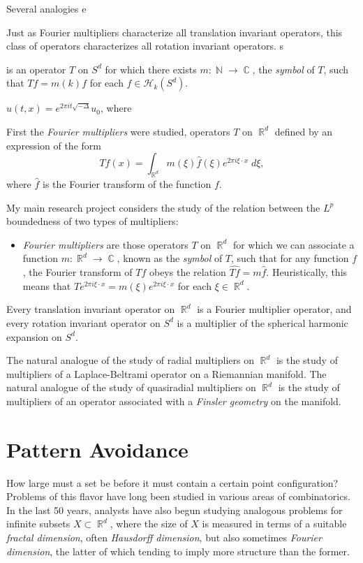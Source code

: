 \documentclass[12pt]{article}
\DeclareMathOperator{\RR}{\mathbb{R}}
\DeclareMathOperator{\NN}{\mathbb{N}}
\DeclareMathOperator{\CC}{\mathbb{C}}
\begin{document}
Several analogies e


Just as Fourier multipliers characterize all translation invariant operators, this class of operators characterizes all rotation invariant operators. 
s



 is an operator $T$ on $S^d$ for which there exists $m: \NN \to \CC$, the \emph{symbol} of $T$, such that $Tf = m(k) f$ for each $f \in \mathcal{H}_k(S^d)$.


$u(t,x) = e^{2 \pi i t \sqrt{-\Delta}} u_0$, where

First the \emph{Fourier multipliers} were studied, operators $T$ on $\RR^d$ defined by an expression of the form
%
\[ Tf(x) = \int_{\RR^d} m(\xi) \widehat{f}(\xi) e^{2 \pi i \xi \cdot x}\; d\xi, \]
%
where $\widehat{f}$ is the Fourier transform of the function $f$.

My main research project considers the study of the relation between the $L^p$ boundedness of two types of multipliers:
%
\begin{itemize}
	\item \emph{Fourier multipliers} are those operators $T$ on $\RR^d$ for which we can associate a function $m: \RR^d \to \CC$, known as the \emph{symbol} of $T$, such that for any function $f$, the Fourier transform of $Tf$ obeys the relation $\widehat{Tf} = m \widehat{f}$. Heuristically, this means that $T e^{2 \pi i \xi \cdot x} = m(\xi) e^{2 \pi i \xi \cdot x}$ for each $\xi \in \RR^d$.
\end{itemize}

  Every translation invariant operator on $\RR^d$ is a Fourier multiplier operator, and every rotation invariant operator on $S^d$ is a multiplier of the spherical harmonic expansion on $S^d$.



The natural analogue of the study of radial multipliers on $\RR^d$ is the study of multipliers of a Laplace-Beltrami operator on a Riemannian manifold. The natural analogue of the study of quasiradial multipliers on $\RR^d$ is the study of multipliers of an operator associated with a \emph{Finsler geometry} on the manifold.

\section*{Pattern Avoidance}

How large must a set be before it must contain a certain point configuration? Problems of this flavor have long been studied in various areas of combinatorics. In the last 50 years, analysts have also begun studying analogous problems for infinite subsets $X \subset \RR^d$, where the size of $X$ is measured in terms of a suitable \emph{fractal dimension}, often \emph{Hausdorff dimension}, but also sometimes \emph{Fourier dimension}, the latter of which tending to imply more structure than the former.
\end{document}
